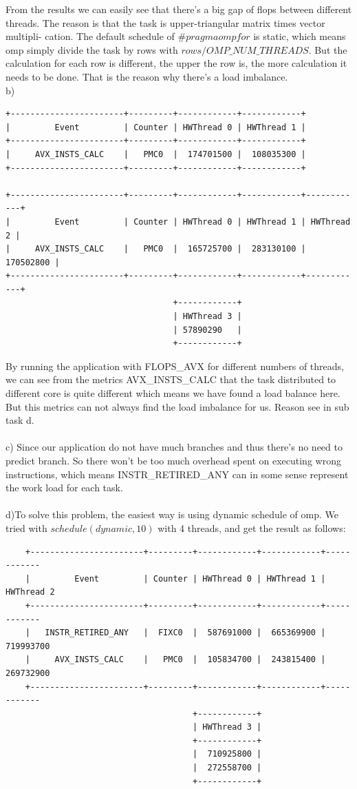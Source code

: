 \documentclass[article]{scrartcl}
\begin{document}
From the results we can easily see that there's a big gap of flops between different threads. The reason is that the task is upper-triangular matrix times vector multipli- cation. 
The default schedule of $\#pragma omp for$ is static, which means omp simply divide the task by rows with $rows/OMP\_NUM\_THREADS$. But the calculation for each row is different, the upper the row is, the more calculation it needs to be done.
That is the reason why there's a load imbalance.\\
b)
\begin{lstlisting}
+-----------------------+---------+------------+------------+
|         Event         | Counter | HWThread 0 | HWThread 1 |
+-----------------------+---------+------------+------------+
|     AVX_INSTS_CALC    |   PMC0  |  174701500 |  108035300 |
+-----------------------+---------+------------+------------+

+-----------------------+---------+------------+------------+------------+
|         Event         | Counter | HWThread 0 | HWThread 1 | HWThread 2 | 
|     AVX_INSTS_CALC    |   PMC0  |  165725700 |  283130100 |  170502800 |   
+-----------------------+---------+------------+------------+------------+
                                  +------------+  
                                  | HWThread 3 |
                                  | 57890290   |
                                  +------------+
\end{lstlisting}
By running the application with FLOPS\_AVX for different numbers of threads, we can see from the metrics AVX\_INSTS\_CALC that the task distributed
to different core is quite different which means we have found a load balance here. But this metrics can not always find the load imbalance for us. Reason see in sub task d.\\
\\
c) Since our application do not have much branches and thus there's no need to predict branch. So there won't be too much overhead spent on executing wrong instructions,
which means INSTR\_RETIRED\_ANY can in some sense represent the work load for each task.\\
\\
d)To solve this problem, the easiest way is using dynamic schedule of omp. We tried with $schedule(dynamic, 10)$ with 4 threads, and get the result as follows:
\begin{lstlisting}
    +-----------------------+---------+------------+------------+------------                                
    |         Event         | Counter | HWThread 0 | HWThread 1 | HWThread 2 
    +-----------------------+---------+------------+------------+------------
    |   INSTR_RETIRED_ANY   |  FIXC0  |  587691000 |  665369900 |  719993700 
    |     AVX_INSTS_CALC    |   PMC0  |  105834700 |  243815400 |  269732900 
    +-----------------------+---------+------------+------------+------------
                                      +------------+
                                      | HWThread 3 |
                                      +------------+
                                      |  710925800 |
                                      |  272558700 |
                                      +------------+ 
\end{lstlisting}
\end{document}

